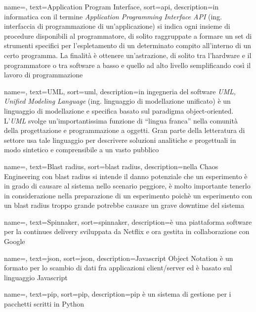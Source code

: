 
\renewcommand{\acronymname}{Acronimi e abbreviazioni}




{
    name=,
    text=Application Program Interface,
    sort=api,
    description={in informatica con il termine \emph{Application Programming Interface API} (ing. interfaccia di programmazione di un'applicazione) si indica ogni insieme di procedure disponibili al programmatore, di solito raggruppate a formare un set di strumenti specifici per l'espletamento di un determinato compito all'interno di un certo programma. La finalità è ottenere un'astrazione, di solito tra l'hardware e il programmatore o tra software a basso e quello ad alto livello semplificando così il lavoro di programmazione}
}

{
    name=,
    text=UML,
    sort=uml,
    description={in ingegneria del software \emph{UML, Unified Modeling Language} (ing. linguaggio di modellazione unificato) è un linguaggio di modellazione e specifica basato sul paradigma object-oriented. L'\emph{UML} svolge un'importantissima funzione di ``lingua franca'' nella comunità della progettazione e programmazione a oggetti. Gran parte della letteratura di settore usa tale linguaggio per descrivere soluzioni analitiche e progettuali in modo sintetico e comprensibile a un vasto pubblico}
}

{
    name=,
    text=Blast radius,
    sort=blast radius,
    description={nella Chaos Engineering con blast radius si intende il danno potenziale che un esperimento è in grado di causare al sistema nello scenario peggiore, è molto importante tenerlo in considerazione nella preparazione di un esperimento poichè un esperimento con un blast radius troppo grande potrebbe causare un grave downtime del sistema}
}

{
    name=,
    text=Spinnaker,
    sort=spinnaker,
    description={è una piattaforma software per la continues delivery sviluppata da Netflix e ora gestita in collaborazione con Google}
}

{
    name=,
    text=json,
    sort=json,
    description={Javascript Object Notation è un formato per lo scambio di dati fra applicazioni client/server ed è basato sul linguaggio Javascript}
}

{
    name=,
    text=pip,
    sort=pip,
    description={pip è un sistema di gestione per i pacchetti scritti in Python}
}